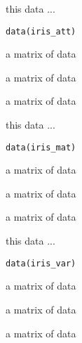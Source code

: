 \documentclass{article}
\begin{document}
\begin{Description}\relax
this data ...
\end{Description}
\begin{Usage}
\begin{verbatim}data(iris_att)\end{verbatim}
\end{Usage}
\begin{Format}\relax
a matrix of data
\end{Format}
\begin{Source}\relax
a matrix of data
\end{Source}
\begin{References}\relax
a matrix of data
\end{References}

\begin{Description}\relax
this data ...
\end{Description}
\begin{Usage}
\begin{verbatim}data(iris_mat)\end{verbatim}
\end{Usage}
\begin{Format}\relax
a matrix of data
\end{Format}
\begin{Source}\relax
a matrix of data
\end{Source}
\begin{References}\relax
a matrix of data
\end{References}

\begin{Description}\relax
this data ...
\end{Description}
\begin{Usage}
\begin{verbatim}data(iris_var)\end{verbatim}
\end{Usage}
\begin{Format}\relax
a matrix of data
\end{Format}
\begin{Source}\relax
a matrix of data
\end{Source}
\begin{References}\relax
a matrix of data
\end{References}
\end{document}

